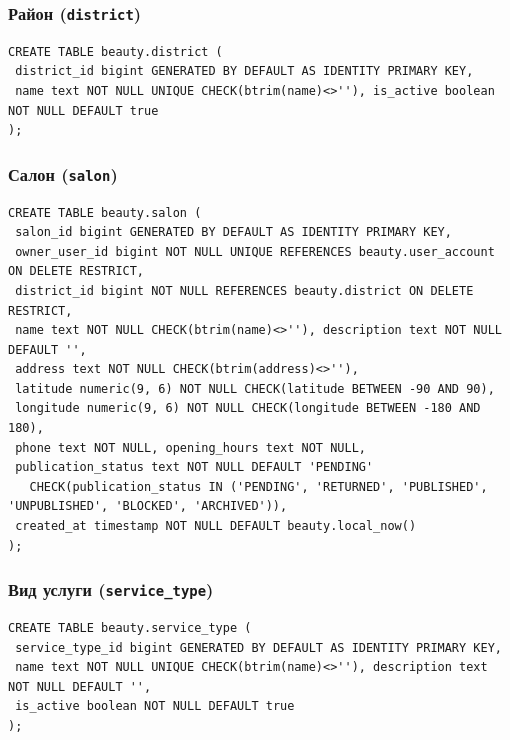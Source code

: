 \documentclass[11pt,a4paper]{article}
\begin{document}
\par\medskip\noindent\begin{minipage}{\linewidth}
\subsubsection*{Район (\texttt{district})}
\begin{lstlisting}[style=sql]
CREATE TABLE beauty.district (
 district_id bigint GENERATED BY DEFAULT AS IDENTITY PRIMARY KEY,
 name text NOT NULL UNIQUE CHECK(btrim(name)<>''), is_active boolean NOT NULL DEFAULT true
);
\end{lstlisting}
\end{minipage}\par\medskip
\par\medskip\noindent\begin{minipage}{\linewidth}
\subsubsection*{Салон (\texttt{salon})}
\begin{lstlisting}[style=sql]
CREATE TABLE beauty.salon (
 salon_id bigint GENERATED BY DEFAULT AS IDENTITY PRIMARY KEY,
 owner_user_id bigint NOT NULL UNIQUE REFERENCES beauty.user_account ON DELETE RESTRICT,
 district_id bigint NOT NULL REFERENCES beauty.district ON DELETE RESTRICT,
 name text NOT NULL CHECK(btrim(name)<>''), description text NOT NULL DEFAULT '',
 address text NOT NULL CHECK(btrim(address)<>''),
 latitude numeric(9, 6) NOT NULL CHECK(latitude BETWEEN -90 AND 90),
 longitude numeric(9, 6) NOT NULL CHECK(longitude BETWEEN -180 AND 180),
 phone text NOT NULL, opening_hours text NOT NULL,
 publication_status text NOT NULL DEFAULT 'PENDING'
   CHECK(publication_status IN ('PENDING', 'RETURNED', 'PUBLISHED', 'UNPUBLISHED', 'BLOCKED', 'ARCHIVED')),
 created_at timestamp NOT NULL DEFAULT beauty.local_now()
);
\end{lstlisting}
\end{minipage}\par\medskip
\par\medskip\noindent\begin{minipage}{\linewidth}
\subsubsection*{Вид услуги (\texttt{service\_\allowbreak{}type})}
\begin{lstlisting}[style=sql]
CREATE TABLE beauty.service_type (
 service_type_id bigint GENERATED BY DEFAULT AS IDENTITY PRIMARY KEY,
 name text NOT NULL UNIQUE CHECK(btrim(name)<>''), description text NOT NULL DEFAULT '',
 is_active boolean NOT NULL DEFAULT true
);
\end{lstlisting}
\end{minipage}\par\medskip
\end{document}
